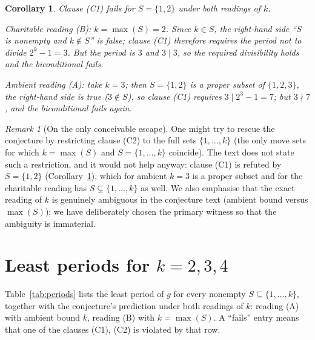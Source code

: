 \documentclass[11pt]{article}
\newtheorem{corollary}[theorem]{Corollary}
\theoremstyle{definition}
\theoremstyle{remark}
\newtheorem{remark}[theorem]{Remark}
\begin{document}
\begin{corollary}\label{cor:clause1}
Clause (C1) fails for $S = \{1,2\}$ under both readings of $k$.

\emph{Charitable reading (B):} $k = \max(S) = 2$. Since $k \in S$, the
right-hand side \emph{``$S$ is nonempty and $k \notin S$''} is false; clause
(C1) therefore requires the period \emph{not} to divide $2^k - 1 = 3$. But the
period is $3$ and $3 \mid 3$, so the required divisibility holds and the
biconditional fails.

\emph{Ambient reading (A):} take $k = 3$; then $S = \{1,2\}$ is a
\emph{proper} subset of $\{1,2,3\}$, the right-hand side is true ($3 \notin S$),
so clause (C1) requires $3 \mid 2^3 - 1 = 7$; but $3 \nmid 7$, and the
biconditional fails again.
\end{corollary}

\begin{remark}[On the only conceivable escape]
One might try to rescue the conjecture by restricting clause (C2) to the full
sets $\{1,\dots,k\}$ (the only move sets for which $k = \max(S)$ and
$S = \{1,\dots,k\}$ coincide). The text does not state such a restriction, and
it would not help anyway: clause (C1) is refuted by $S = \{1,2\}$
(Corollary~\ref{cor:clause1}), which for ambient $k=3$ is a proper subset and
for the charitable reading has $S \subsetneq \{1,\dots,k\}$ as well.
We also emphasise that the exact reading of $k$ is genuinely ambiguous in the
conjecture text (ambient bound versus $\max(S)$); we have deliberately chosen
the primary witness so that the ambiguity is immaterial.
\end{remark}

\section{Least periods for $k = 2, 3, 4$}

Table~\ref{tab:periods} lists the least period of $g$ for every nonempty
$S \subseteq \{1,\dots,k\}$, together with the conjecture's prediction under
both readings of $k$: reading (A) with ambient bound $k$, reading (B) with
$k = \max(S)$. A ``fails'' entry means that one of the clauses (C1), (C2) is
violated by that row.
\end{document}
